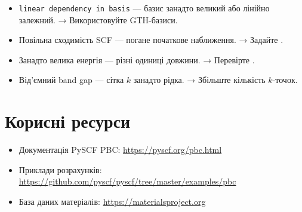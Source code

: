 \begin{itemize}
    \item \texttt{linear dependency in basis} --- базис занадто великий або лінійно залежний.
    → Використовуйте GTH-базиси.

    \item Повільна сходимість SCF --- погане початкове наближення.
    → Задайте .

    \item Занадто велика енергія --- різні одиниці довжини.
    → Перевірте .

    \item Від’ємний band gap --- сітка $k$ занадто рідка.
    → Збільште кількість $k$-точок.
\end{itemize}

\section{Корисні ресурси}

\begin{itemize}
    \item Документація PySCF PBC: \url{https://pyscf.org/pbc.html}
    \item Приклади розрахунків: \url{https://github.com/pyscf/pyscf/tree/master/examples/pbc}
    \item База даних матеріалів: \url{https://materialsproject.org}
\end{itemize}
